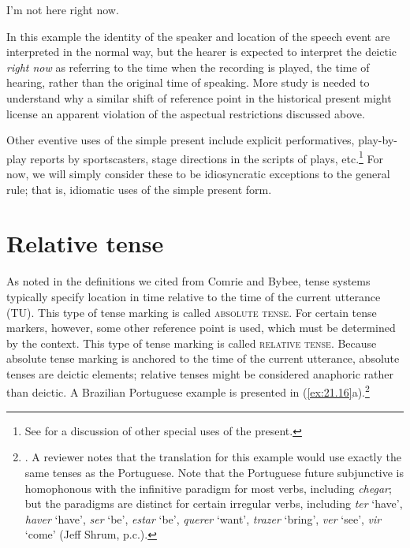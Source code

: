 \ea \label{ex:21.15}
I’m not here right now.
\z


In this example the identity of the speaker and location of the speech event are interpreted in the normal way, but the hearer is expected to interpret the deictic \textit{right now} as referring to the time when the recording is played, the time of hearing, rather than the original time of speaking. More study is needed to understand why a similar shift of reference point in the historical present might license an apparent violation of the aspectual restrictions discussed above.



Other eventive uses of the simple present include explicit performatives, play-by-play reports by sportscasters, stage directions in the scripts of plays, etc.\footnote{See \citet{Klein2009} for a discussion of other special uses of the present.} For now, we will simply consider these to be idiosyncratic exceptions to the general rule; that is, idiomatic uses of the simple present form.


\section{Relative tense}\label{sec:21.4}

As noted in the definitions we cited from Comrie and Bybee, tense systems typically specify location in time relative to the time of the current utterance (TU). This type of tense marking is called \textsc{absolute tense}. For certain tense markers, however, some other reference point is used, which must be determined by the context. This type of tense marking is called \textsc{relative tense}. Because absolute tense marking is anchored to the time of the current utterance, absolute tenses are deictic elements; relative tenses might be considered anaphoric rather than deictic. A  Brazilian Portuguese example is presented in (\ref{ex:21.16}a).\footnote{\citet[31]{Comrie1985}. A reviewer notes that the  translation for this example would use exactly the same tenses as the {Portuguese}. Note that the {Portuguese} future subjunctive is homophonous with the infinitive paradigm for most verbs, including \textit{chegar}; but the paradigms are distinct for certain irregular verbs, including \textit{ter} ‘have’, \textit{haver} ‘have’, \textit{ser} ‘be’, \textit{estar} ‘be’, \textit{querer} ‘want’, \textit{trazer} ‘bring’, \textit{ver} ‘see’, \textit{vir} ‘come’ (Jeff Shrum, p.c.).}


